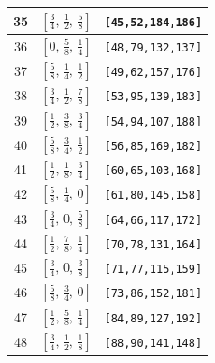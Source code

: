 \documentclass[fleqn,8pt]{jsarticle}
\begin{document}
\begin{longtable}{ccc}
35 & $\left[ \frac{3}{4},\, \frac{1}{2},\, \frac{5}{8} \right]$ & {\tt [45,52,184,186]} \\ \hline
36 & $\left[ 0,\, \frac{5}{8},\, \frac{1}{4} \right]$ & {\tt [48,79,132,137]} \\ \hline
37 & $\left[ \frac{5}{8},\, \frac{1}{4},\, \frac{1}{2} \right]$ & {\tt [49,62,157,176]} \\ \hline
38 & $\left[ \frac{3}{4},\, \frac{1}{2},\, \frac{7}{8} \right]$ & {\tt [53,95,139,183]} \\ \hline
39 & $\left[ \frac{1}{2},\, \frac{3}{8},\, \frac{3}{4} \right]$ & {\tt [54,94,107,188]} \\ \hline
40 & $\left[ \frac{5}{8},\, \frac{3}{4},\, \frac{1}{2} \right]$ & {\tt [56,85,169,182]} \\ \hline
41 & $\left[ \frac{1}{2},\, \frac{1}{8},\, \frac{3}{4} \right]$ & {\tt [60,65,103,168]} \\ \hline
42 & $\left[ \frac{5}{8},\, \frac{1}{4},\, 0 \right]$ & {\tt [61,80,145,158]} \\ \hline
43 & $\left[ \frac{3}{4},\, 0,\, \frac{5}{8} \right]$ & {\tt [64,66,117,172]} \\ \hline
44 & $\left[ \frac{1}{2},\, \frac{7}{8},\, \frac{1}{4} \right]$ & {\tt [70,78,131,164]} \\ \hline
45 & $\left[ \frac{3}{4},\, 0,\, \frac{3}{8} \right]$ & {\tt [71,77,115,159]} \\ \hline
46 & $\left[ \frac{5}{8},\, \frac{3}{4},\, 0 \right]$ & {\tt [73,86,152,181]} \\ \hline
47 & $\left[ \frac{1}{2},\, \frac{5}{8},\, \frac{1}{4} \right]$ & {\tt [84,89,127,192]} \\ \hline
48 & $\left[ \frac{3}{4},\, \frac{1}{2},\, \frac{1}{8} \right]$ & {\tt [88,90,141,148]} \\
\end{longtable}
\renewcommand{\arraystretch}{1.2}
\end{document}
